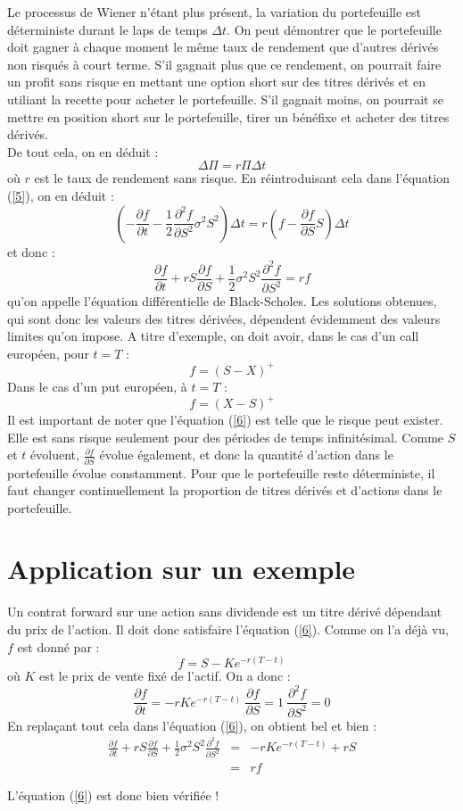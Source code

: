 Le processus de Wiener n'étant plus présent, la variation du portefeuille est déterministe durant le laps de temps $\Delta t$. On peut démontrer que le portefeuille doit gagner à chaque moment le même taux de rendement que d'autres dérivés non risqués à court terme. S'il gagnait plus que ce rendement, on pourrait faire un profit sans risque en mettant une option short sur des titres dérivés et en utiliant la recette pour acheter le portefeuille. S'il gagnait moins, on pourrait se mettre en position short sur le portefeuille, tirer un bénéfixe et acheter des titres dérivés.\\
De tout cela, on en déduit : \[\Delta\Pi = r\Pi\Delta t\]
où $r$ est le taux de rendement sans risque. En réintroduisant cela dans l'équation (\ref{5}), on en déduit : 
\[\left( -\frac{\partial f}{\partial t} - \frac{1}{2} \frac{\partial^2 f}{\partial S^2}\sigma^2S^2 \right) \Delta t = r\left( f-\frac{\partial f}{\partial S}S\right) \Delta t\]
et donc :
\begin{equation} \label{6} \frac{\partial f}{\partial t}+rS\frac{\partial f}{\partial S} + \frac{1}{2} \sigma^2S^2 \frac{\partial^2 f}{\partial S^2} = rf\end{equation}
qu'on appelle l'équation différentielle de Black-Scholes. Les solutions obtenues, qui sont donc les valeurs des titres dérivées, dépendent évidemment des valeurs limites qu'on impose. A titre d'exemple, on doit avoir, dans le cas d'un call européen, pour $t=T$ : \[f=(S-X)^+\]
Dans le cas d'un put européen, à $t=T$ : \[f=(X-S)^+\]
Il est important de noter que l'équation (\ref{6}) est telle que le risque peut exister. Elle est sans risque seulement pour des périodes de temps infinitésimal. Comme $S$ et $t$ évoluent, $\frac{\partial f}{\partial S}$ évolue également, et donc la quantité d'action dans le portefeuille évolue constamment. Pour que le portefeuille reste déterministe, il faut changer continuellement la proportion de titres dérivés et d'actions dans le portefeuille.

\section{Application sur un exemple}
Un contrat forward sur une action sans dividende est un titre dérivé dépendant du prix de l'action. Il doit donc satisfaire l'équation (\ref{6}). Comme on l'a déjà vu, $f$ est donné par : 
\[f=S-Ke^{-r(T-t)}\]
où $K$ est le prix de vente fixé de l'actif. On a donc : 
\[\frac{\partial f}{\partial t} = -rKe^{-r(T-t)}\ \frac{\partial f}{\partial S}=1\ \frac{\partial^2 f}{\partial S^2} = 0\]
En replaçant tout cela dans l'équation (\ref{6}), on obtient bel et bien :
\begin{eqnarray*}
	\frac{\partial f}{\partial t}+rS\frac{\partial f}{\partial S} + \frac{1}{2} \sigma^2S^2 \frac{\partial^2 f}{\partial S^2}
		&=& -rKe^{-r(T-t)}+rS\\
		&=& rf
\end{eqnarray*}

L'équation (\ref{6}) est donc bien vérifiée !
